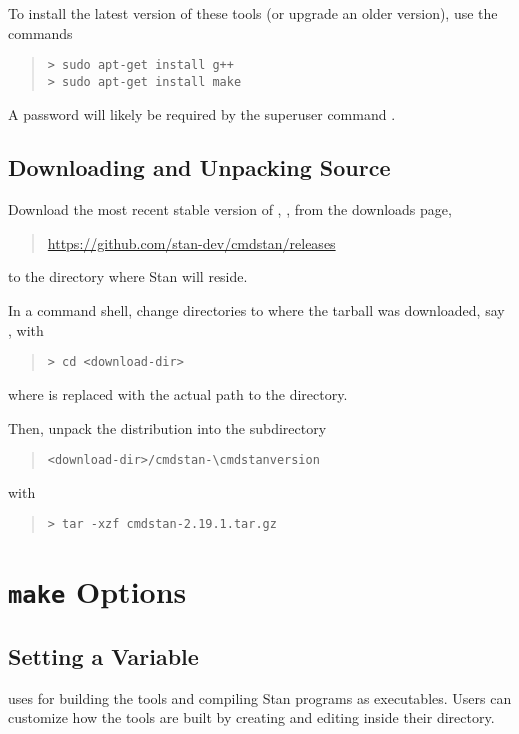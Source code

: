 To install the latest version of these
tools (or upgrade an older version), use the commands
%
\begin{quote}
\begin{Verbatim}[fontshape=sl,fontsize=\small]
> sudo apt-get install g++
> sudo apt-get install make
\end{Verbatim}
\end{quote}
%
A password will likely be required by the superuser command .


\subsection{Downloading and Unpacking \CmdStan Source}

Download the most recent stable version of \CmdStan,
, from the \CmdStan downloads page,
%
\begin{quote}
\url{https://github.com/stan-dev/cmdstan/releases}
\end{quote}
%
to the directory where Stan will reside.

In a command shell, change directories to where the tarball was
downloaded, say , with
%
\begin{quote}
\begin{Verbatim}[fontshape=sl,fontsize=\small]
> cd <download-dir>
\end{Verbatim}
\end{quote}
%
where  is replaced with the actual path to the directory.

Then, unpack the distribution into the subdirectory
\begin{quote}
\nolinkurl{<download-dir>/cmdstan-\cmdstanversion}
\end{quote}
%
with
%
\begin{quote}
\begin{Verbatim}[fontshape=sl,fontsize=\small]
> tar -xzf cmdstan-2.19.1.tar.gz
\end{Verbatim}
\end{quote}


\section{{\tt make} Options}\label{make-options.appendix}

\subsection{Setting a Variable}
\CmdStan uses  for building the \CmdStan tools and
compiling Stan programs as executables. Users can customize how the
tools are built by creating and editing  inside their
 directory.

